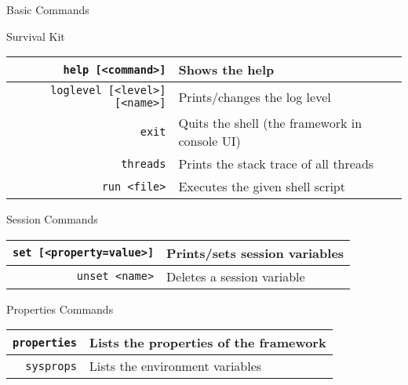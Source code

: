 \begin{frame}{Basic Commands}
\begin{block}{Survival Kit}
\centering
\begin{footnotesize}
\begin{tabular}{r p{}}
\texttt{\scriptsize help [<command>]} & Shows the help \\
\hline
\texttt{\scriptsize loglevel [<level>] [<name>]} & Prints/changes the log level \\
\hline
\texttt{\scriptsize exit} & Quits the shell \newline (the framework in console UI) \\
\hline
\texttt{\scriptsize threads} & Prints the stack trace of all threads \\
\hline
\texttt{\scriptsize run <file>} & Executes the given shell script \\
\end{tabular}
\end{footnotesize}
\end{block}

\begin{block}{Session Commands}
\centering
\begin{footnotesize}
\begin{tabular}{r l}
\texttt{set {\scriptsize [<property=value>]}} & Prints/sets session variables \\
\hline
\texttt{unset {\scriptsize <name>}} & Deletes a session variable \\
\end{tabular}
\end{footnotesize}
\end{block}

\begin{block}{Properties Commands}
\centering
\begin{footnotesize}
\begin{tabular}{r l}
\texttt{properties} & Lists the properties of the framework \\
\hline
\texttt{sysprops} & Lists the environment variables \\
\end{tabular}
\end{footnotesize}
\end{block}
\end{frame}


